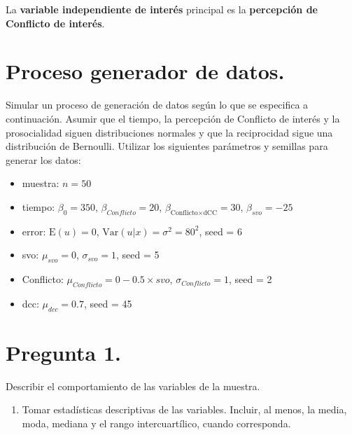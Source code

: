 \documentclass[
  spanish,
  10pt,
]{article}
\providecommand{\tightlist}{%
  \setlength{\itemsep}{0pt}\setlength{\parskip}{0pt}}
\begin{document}
La \textbf{variable independiente de interés} principal es la
\textbf{percepción de Conflicto de interés}.

\section{Proceso generador de datos.}\label{proceso-generador-de-datos.}

Simular un proceso de generación de datos según lo que se especifica a
continuación. Asumir que el tiempo, la percepción de Conflicto de
interés y la prosocialidad siguen distribuciones normales y que la
reciprocidad sigue una distribución de Bernoulli. Utilizar los
siguientes parámetros y semillas para generar los datos:

\begin{itemize}
\tightlist
\item
  muestra: \(n = 50\)
\item
  tiempo: \(\beta_0 = 350\), \(\beta_{Conflicto} = 20\),
  \(\beta_{\text{Conflicto} \times \text{dCC}} = 30\),
  \(\beta_{svo} = -25\)
\item
  error: \(\mathrm{E}(u) = 0\), \(\mathrm{Var}(u|x) = \sigma^2 = 80^2\),
  seed = 6
\item
  svo: \(\mu_{svo} = 0\), \(\sigma_{svo} = 1\), seed = 5
\item
  Conflicto: \(\mu_{Conflicto} = 0 - 0.5 \times svo\),
  \(\sigma_{Conflicto} = 1\), seed = 2
\item
  dcc: \(\mu_{dcc} = 0.7\), seed = 45
\end{itemize}

\newpage

\section{Pregunta 1.}\label{pregunta-1.}

Describir el comportamiento de las variables de la muestra.

\begin{enumerate}
\def\labelenumi{(\alph{enumi})}
\tightlist
\item
  Tomar estadísticas descriptivas de las variables. Incluir, al menos,
  la media, moda, mediana y el rango intercuartílico, cuando
  corresponda.
\end{enumerate}
\end{document}

